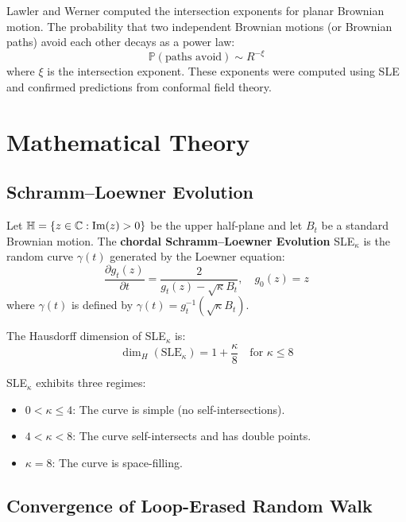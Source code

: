 Lawler and Werner computed the intersection exponents for planar Brownian motion. The probability that two independent Brownian motions (or Brownian paths) avoid each other decays as a power law:
\[
\mathbb{P}(\text{paths avoid}) \sim R^{-\xi}
\]
where $\xi$ is the intersection exponent. These exponents were computed using SLE and confirmed predictions from conformal field theory.

\section{Mathematical Theory}

\subsection{Schramm--Loewner Evolution}

\begin{definition}
Let $\H = \{z \in \C: \Im(z) > 0\}$ be the upper half-plane and let $B_t$ be a standard Brownian motion. The \textbf{chordal Schramm--Loewner Evolution} SLE$_\kappa$ is the random curve $\gamma(t)$ generated by the Loewner equation:
\[
\frac{\partial g_t(z)}{\partial t} = \frac{2}{g_t(z) - \sqrt{\kappa} B_t}, \quad g_0(z) = z
\]
where $\gamma(t)$ is defined by $\gamma(t) = g_t^{-1}(\sqrt{\kappa} B_t)$.
\end{definition}

\begin{theorem}
The Hausdorff dimension of SLE$_\kappa$ is:
\[
\dim_H(\text{SLE}_\kappa) = 1 + \frac{\kappa}{8} \quad \text{for } \kappa \leq 8
\]
\end{theorem}

\begin{theorem}
SLE$_\kappa$ exhibits three regimes:
\begin{itemize}
    \item $0 < \kappa \leq 4$: The curve is simple (no self-intersections).
    \item $4 < \kappa < 8$: The curve self-intersects and has double points.
    \item $\kappa = 8$: The curve is space-filling.
\end{itemize}
\end{theorem}

\subsection{Convergence of Loop-Erased Random Walk}

